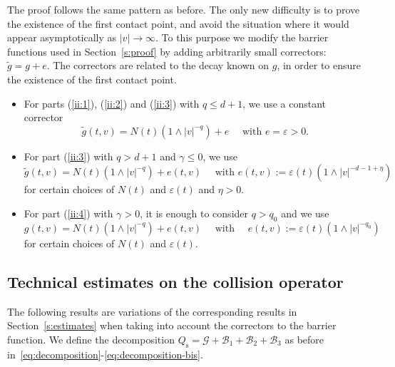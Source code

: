 \documentclass[JEP,XML,SOM,Unicode,NoFloatCountersInSection]{cedram}
\newcommand{\rs}{\mathrm{s}}
\theoremstyle{plain}
\theoremstyle{definition}
\numberwithin{equation}{section}
\newcommand{\eps}{\varepsilon}
\let\A N
\begin{document}
The proof follows the same pattern as before. The only new difficulty
is to prove the existence of the first contact point, and avoid the
situation where it would appear asymptotically as $|v| \to \infty$. To
this purpose we modify the barrier functions used in
Section~\ref{s:proof} by adding arbitrarily small correctors:
$\tilde g = g + e$. The correctors are related to the decay known on
$g$, in order to ensure the existence of the first contact point.

\begin{itemize}
\item For parts (\ref{ii:1}), (\ref{ii:2}) and (\ref{ii:3}) with
$q \leq d+1$, we use a constant corrector
\begin{equation}
\label{e:g1}
\tilde g(t,v) = \A(t) \left(1 \wedge |v|^{-q}\right) + e \quad
\mbox{ with } e = \eps >0.
\end{equation}

\item For part (\ref{ii:3}) with $q>d+1$ and $\gamma \leq 0$, we use
\begin{equation} \label{e:g2} \tilde g(t,v) = \A(t) \left(1 \wedge
|v|^{-q} \right) + e(t,v) \quad \mbox{ with } e(t,v):=\eps(t) \left(1 \wedge
|v|^{-d-1+\eta}\right)
\end{equation}
for certain choices of $\A(t)$ and $\eps(t)$ and $\eta>0$.

\item For part (\ref{ii:4}) with $\gamma > 0$, it is enough to
consider $q > q_0$ and we use
\begin{equation} \label{e:g3} g(t,v) = \A(t) \left(1 \wedge |v|^{-q}\right) +
e(t,v) \quad \mbox{ with } \quad e(t,v) := \eps(t) \left(1 \wedge
|v|^{-q_0}\right)
\end{equation}
for certain choices of $\A(t)$ and $\eps(t)$.
\end{itemize}

\subsection{Technical estimates on the collision operator}

The following results are variations of the corresponding results in
Section~\ref{s:estimates} when taking into account the correctors to
the barrier function. We define the decomposition
$Q_{\rs} = \mathcal{G} + \mathcal{B}_1 + \mathcal{B}_2 + \mathcal{B}_3$ as
before in~\eqref{eq:decomposition}-\eqref{eq:decomposition-bis}.
\end{document}
